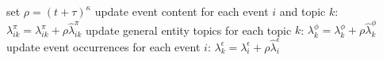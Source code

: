 \documentclass{article}
\begin{document}
\begin{algorithm}[h]
\begin{algorithmic}[1]
		\EndFor
	\EndFor
	\State set $\rho= (t +\tau)^\kappa$
	\State update event content for each event $i$ and topic $k$: $\lambda^{\pi}_{ik} = \lambda^{\pi}_{ik} + \rho \hat\lambda^{\pi}_{ik} $
	\State update general entity topics for each topic $k$: $\lambda^{\phi}_{k} = \lambda^{\phi}_{k} + \rho \hat\lambda^{\phi}_{k}$
	\State update event occurrences for each event $i$: $\lambda^{\epsilon}_{k} = \lambda^{\epsilon}_{i} + \rho \hat\lambda^{\epsilon}_{i}$
\end{algorithmic}
\end{algorithm}
\end{document}
